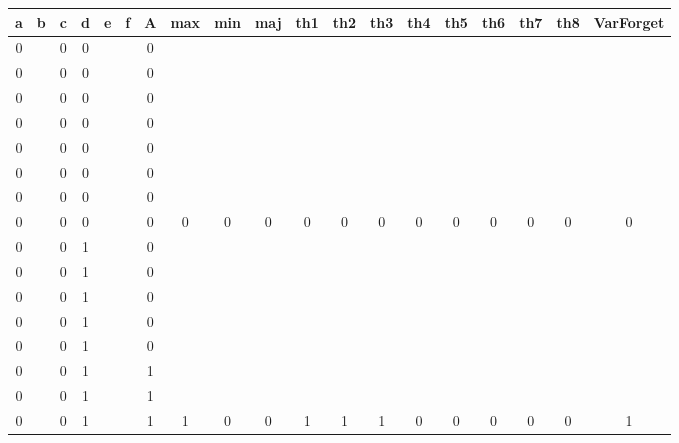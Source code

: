 \begin{table}[!tb]
    \centering
    \begin{tabular}{|c|c|c|c|c|c|c|c|c|c|c|c|c|c|c|c|c|c|c|}
        \hline
        \textbf{a} & \textbf{b} & \textbf{c} & \textbf{d} & \textbf{e} & \textbf{f} & \textbf{A} & \textbf{max} & \textbf{min} & \textbf{maj} & \textbf{th1} & \textbf{th2} & \textbf{th3} & \textbf{th4} & \textbf{th5} & \textbf{th6} & \textbf{th7} & \textbf{th8} & \textbf{VarForget} \\ \hline
        \rowcolor{gray!40} 0 &  & 0 & 0 &  &  & 0 &  &  &  &  &  &  &  &  &  &  &  &  \\ \hline
        \rowcolor{gray!40} 0 &  & 0 & 0 &  &  & 0 &  &  &  &  &  &  &  &  &  &  &  &  \\ \hline
        \rowcolor{gray!40} 0 &  & 0 & 0 &  &  & 0 &  &  &  &  &  &  &  &  &  &  &  &  \\ \hline
        \rowcolor{gray!40} 0 &  & 0 & 0 &  &  & 0 &  &  &  &  &  &  &  &  &  &  &  &  \\ \hline
        \rowcolor{gray!40} 0 &  & 0 & 0 &  &  & 0 &  &  &  &  &  &  &  &  &  &  &  &  \\ \hline
        \rowcolor{gray!40} 0 &  & 0 & 0 &  &  & 0 &  &  &  &  &  &  &  &  &  &  &  &  \\ \hline
        \rowcolor{gray!40} 0 &  & 0 & 0 &  &  & 0 &  &  &  &  &  &  &  &  &  &  &  &  \\ \hline
        \rowcolor{gray!40} 0 &  & 0 & 0 &  &  & 0 & 0 & 0 & 0 & 0 & 0 & 0 & 0 & 0 & 0 & 0 & 0 & 0 \\ \hline
        \rowcolor{blue!40} 0 &  & 0 & 1 &  &  & 0 &  &  &  &  &  &  &  &  &  &  &  &  \\ \hline
        \rowcolor{blue!40} 0 &  & 0 & 1 &  &  & 0 &  &  &  &  &  &  &  &  &  &  &  &  \\ \hline
        \rowcolor{blue!40} 0 &  & 0 & 1 &  &  & 0 &  &  &  &  &  &  &  &  &  &  &  &  \\ \hline
        \rowcolor{blue!40} 0 &  & 0 & 1 &  &  & 0 &  &  &  &  &  &  &  &  &  &  &  &  \\ \hline
        \rowcolor{blue!40} 0 &  & 0 & 1 &  &  & 0 &  &  &  &  &  &  &  &  &  &  &  &  \\ \hline
        \rowcolor{blue!40} 0 &  & 0 & 1 &  &  & 1 &  &  &  &  &  &  &  &  &  &  &  &  \\ \hline
        \rowcolor{blue!40} 0 &  & 0 & 1 &  &  & 1 &  &  &  &  &  &  &  &  &  &  &  &  \\ \hline
        \rowcolor{blue!40} 0 &  & 0 & 1 &  &  & 1 & 1 & 0 & 0 & 1 & 1 & 1 & 0 & 0 & 0 & 0 & 0 & 1 \\ \hline

\end{tabular}
\end{table}
